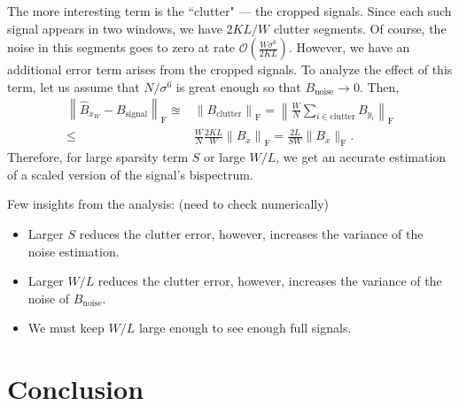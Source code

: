 \documentclass[12pt,a4paper]{article}
\numberwithin{equation}{section}
\numberwithin{figure}{section}
\theoremstyle{plain}
\theoremstyle{definition}
\theoremstyle{remark}
\theoremstyle{plain}
\theoremstyle{remark}
\theoremstyle{plain}
\theoremstyle{plain}
\newcommand{\order}[1]{\mathcal{O}\left({#1} \right)}
\begin{document}
The more interesting term is the ``clutter" --- the cropped signals. Since each such signal appears in two windows,
we have $2KL/W$ clutter segments. Of course, the noise in this segments goes to zero
at rate $\order{\frac{W\sigma^6}{2KL}}$. However, we have an additional error term arises from  the cropped signals. To analyze the effect of this term, let us assume that $N/\sigma^6$ is great enough so that $B_\textrm{noise}\to 0$. Then,
\begin{equation}
\begin{split}
\left\| \hat{B}_{x_W} - B_\textrm{signal}\right\|_{\textrm{F}} \approxeq&  \left\|B_\textrm{clutter}\right\|_{\textrm{F}}
= \left\|\frac{W}{N}\sum_{i\in\textrm{clutter}}B_{y_i}\right\|_{\textrm{F}}
\\ \leq & 
\frac{W}{N}\frac{2KL}{W}\left\|B_x\right\|_{\textrm{F}} = \frac{2L}{SW}
\|B_x\|_{\textrm{F}}.
\end{split}
\end{equation}
Therefore, for large sparsity term $S$ or large $W/L$, we get an accurate estimation of a scaled version of the signal's bispectrum. 


Few insights from the analysis: (need to check numerically)
\begin{itemize}
	\item Larger $S$ reduces the clutter error, however, increases the variance of the noise estimation.
	\item Larger $W/L$ reduces the clutter error, however, increases the variance of the noise  of $B_\textrm{noise}$.
	\item We must keep $W/L$ large enough to see enough full signals.    
\end{itemize} 




\section{Conclusion} \label{sec:conclusion}






\end{document}
